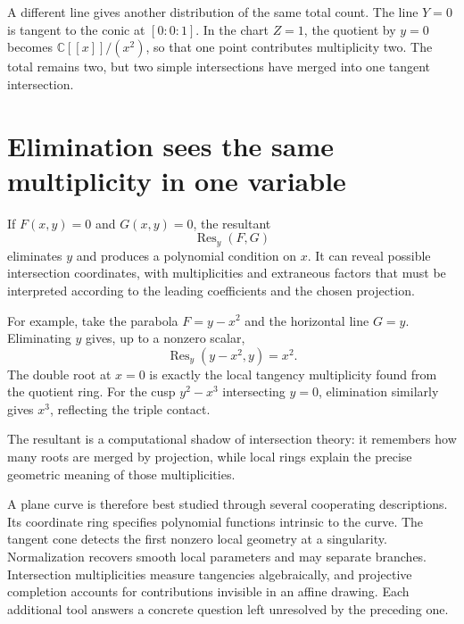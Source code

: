 A different line gives another distribution of the same total count. The line \(Y=0\) is tangent to the conic at \([0:0:1]\). In the chart \(Z=1\), the quotient by \(y=0\) becomes \(\mathbb C[[x]]/(x^2)\), so that one point contributes multiplicity two. The total remains two, but two simple intersections have merged into one tangent intersection.

\section{Elimination sees the same multiplicity in one variable}

If \(F(x,y)=0\) and \(G(x,y)=0\), the resultant
\[
 \operatorname{Res}_y(F,G)
\]
eliminates \(y\) and produces a polynomial condition on \(x\). It can reveal possible intersection coordinates, with multiplicities and extraneous factors that must be interpreted according to the leading coefficients and the chosen projection.

For example, take the parabola \(F=y-x^2\) and the horizontal line \(G=y\). Eliminating \(y\) gives, up to a nonzero scalar,
\[
 \operatorname{Res}_y(y-x^2,y)=x^2.
\]
The double root at \(x=0\) is exactly the local tangency multiplicity found from the quotient ring. For the cusp \(y^2-x^3\) intersecting \(y=0\), elimination similarly gives \(x^3\), reflecting the triple contact.

The resultant is a computational shadow of intersection theory: it remembers how many roots are merged by projection, while local rings explain the precise geometric meaning of those multiplicities.

A plane curve is therefore best studied through several cooperating descriptions. Its coordinate ring specifies polynomial functions intrinsic to the curve. The tangent cone detects the first nonzero local geometry at a singularity. Normalization recovers smooth local parameters and may separate branches. Intersection multiplicities measure tangencies algebraically, and projective completion accounts for contributions invisible in an affine drawing. Each additional tool answers a concrete question left unresolved by the preceding one.
